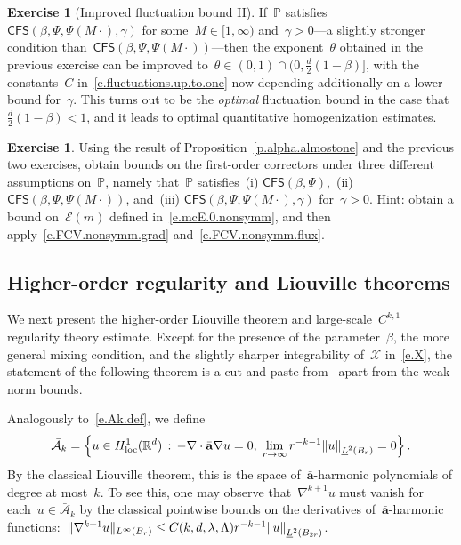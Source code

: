 \documentclass[11pt,twoside]{article} %
\numberwithin{equation}{section}
\theoremstyle{definition}
\newtheorem{exercise}[theorem]{Exercise}
\let\originalleft\left
\let\originalright\right
\renewcommand{\left}{\mathopen{}\mathclose\bgroup\originalleft}
\renewcommand{\right}{\aftergroup\egroup\originalright}
\newcommand*{\R}{\ensuremath{\mathbb{R}}}
\renewcommand{\a}{\mathbf{a}}
\newcommand{\ahom}{\bar{\a}}
\renewcommand{\P}{\mathbb{P}}
\newcommand{\X}{\mathcal{X}}
\newcommand{\CFS}{\mathsf{CFS}}
\newcommand{\A}{\mathcal{A}}
\newcommand{\Ahom}{\bar{\A}}
\begin{document}
\begin{exercise}[Improved fluctuation bound II]
\label{exercise.improved.fluct.2}
If~$\P$ satisfies~$\CFS(\beta,\Psi,\Psi(M\cdot),\gamma)$ for some~$M\in[1,\infty)$ and~$\gamma>0$---a slightly stronger condition than~$\CFS(\beta,\Psi, \Psi(M\cdot))$---then the  exponent~$\theta$ obtained in the previous exercise can be improved to~$\theta \in (0,1) \cap (0, \frac d2(1-\beta) ]$, with the constants~$C$ in~\eqref{e.fluctuations.up.to.one} now depending additionally on a lower bound for~$\gamma$. This turns out to be the \emph{optimal} fluctuation bound in the case that~$\frac d2(1-\beta) < 1$, and it leads to optimal quantitative homogenization estimates.
\end{exercise}

\begin{exercise}
\label{exercise.corrector.bounds}
Using the result of Proposition~\ref{p.alpha.almostone} and the previous two exercises, obtain bounds on the first-order correctors under three different assumptions on~$\P$, namely that~$\P$ satisfies~(i) $\CFS(\beta,\Psi)$,~(ii) $\CFS(\beta,\Psi,\Psi(M\cdot))$, and~(iii) $\CFS(\beta,\Psi,\Psi(M\cdot),\gamma)$ for~$\gamma>0$. 
Hint: obtain a bound on~$\mathcal{E}(m)$ defined in~\eqref{e.mcE.0.nonsymm}, and then apply~\eqref{e.FCV.nonsymm.grad} and~\eqref{e.FCV.nonsymm.flux}. 
\end{exercise}



\subsection{Higher-order regularity and Liouville theorems}
\label{ss.higherorder.reg}

We next present the higher-order Liouville theorem and large-scale~$C^{k,1}$ regularity theory estimate. Except for the presence of the parameter~$\beta$, the more general mixing condition, and the slightly sharper integrability of~$\X$ in~\eqref{e.X}, the statement of the following theorem is a cut-and-paste from~\cite[Theorem 3.8]{AKMBook} apart from the weak norm bounds.

\smallskip

Analogously to~\eqref{e.Ak.def}, we define 
\begin{equation}  
\label{e.Ahomk.def}
\Ahom_k  = \Bigl \{ u \in H^1_{\mathrm{loc}}(\R^d) \, : \, -\nabla \cdot \ahom \nabla u = 0, \; \lim_{r\to \infty} r^{-k-1} \left\| u \right\|_{\underline{L}^2 \left( B_{r} \right)} = 0  \Bigr \} \,.
\end{equation}
By the classical Liouville theorem, this is the space of~$\ahom$-harmonic polynomials of degree at most~$k$.
To see this, one may observe that~$\nabla^{k+1} u$ must vanish for each~$u \in \Ahom_k$ by the classical pointwise bounds on the derivatives of~$\ahom$-harmonic functions:~$\|\nabla^{k+1} u\|_{L^\infty(B_{r})} \leq C(k,d,\lambda,\Lambda)r^{-k-1} \left\| u \right\|_{\underline{L}^2 \left( B_{2r} \right)}$. 
\end{document}
